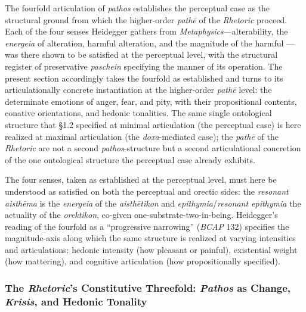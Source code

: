 \documentclass{article}
\begin{document}
The fourfold articulation of \textit{pathos} establishes the perceptual case as the structural ground from which the higher-order \textit{path\=e} of the \textit{Rhetoric} proceed. Each of the four senses Heidegger gathers from \textit{Metaphysics}---alterability, the \textit{energeia} of alteration, harmful alteration, and the magnitude of the harmful --- was there shown to be satisfied at the perceptual level, with the structural register of preservative \textit{paschein} specifying the manner of its operation. The present section accordingly takes the fourfold as established and turns to its articulationally concrete instantiation at the higher-order \textit{path\=e} level: the determinate emotions of anger, fear, and pity, with their propositional contents, conative orientations, and hedonic tonalities. The same single ontological structure that \S1.2 specified at minimal articulation (the perceptual case) is here realized at maximal articulation (the \textit{doxa}-mediated case); the \textit{path\=e} of the \textit{Rhetoric} are not a second \textit{pathos}-structure but a second articulational concretion of the one ontological structure the perceptual case already exhibits.

The four senses, taken as established at the perceptual level, must here be understood as satisfied on both the perceptual and orectic sides: the \textit{resonant aisthēma} is the \textit{energeia} of the \textit{aisthētikon} and \textit{epithymia}/\textit{resonant epithymia} the actuality of the \textit{orektikon}, co-given one-substrate-two-in-being. Heidegger's reading of the fourfold as a ``progressive narrowing'' (\textit{BCAP} 132) specifies the magnitude-axis along which the same structure is realized at varying intensities and articulations: hedonic intensity (how pleasant or painful), existential weight (how mattering), and cognitive articulation (how propositionally specified).

\subsubsection{The \textit{Rhetoric}'s Constitutive Threefold: \textit{Pathos} as Change, \textit{Krisis}, and Hedonic Tonality}
\end{document}
